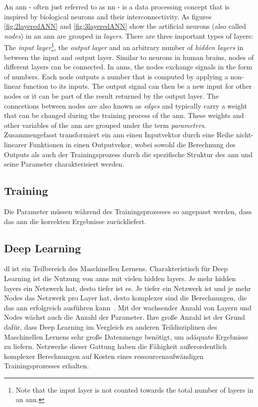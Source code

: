 \documentclass[
			   fontsize=11pt,
               paper=a4,
               bibliography=totoc,
               idxtotoc,
               headsepline,
               footsepline,
               footinclude=false,
               BCOR=12mm,
               DIV=13,
               openany,   %
               ]
               {scrbook}
\begin{document}
An \gls{ann} - often just referred to as \gls{nn} - is a data processing concept that is inspired by biological neurons and their interconnectivity. As figures \ref{fig:2layeredANN} and \ref{fig:3layeredANN} show the artificial neurons (also called \textit{nodes}) in an \gls{ann} are grouped in \textit{layers}. There are three important types of layers: The \textit{input layer}\footnote{Note that the input layer is not counted towards the total number of layers in an \gls{ann}.}, the \textit{output layer} and an arbitrary number of \textit{hidden layers} in between the input and output layer. Similar to neurons in human brains, nodes of different layers can be connected. In \glspl{ann}, the nodes exchange signals in the form of numbers. Each node outputs a number that is computed by applying a non-linear function to its inputs. The output signal can then be a new input for other nodes or it can be part of the result returned by the output layer. The conncetions between nodes are also known as \textit{edges} and typically carry a weight that can be changed during the training process of the \gls{ann}. These weights and other variables of the \gls{ann} are grouped under the term \textit{parameters}. Zusammengefasst transformiert ein \gls{ann} einen Inputvektor durch eine Reihe nicht-linearer Funktionen in einen Outputvekor, wobei sowohl die Berechnung des Outputs als auch der Trainingsprozess durch die spezifische Struktur des \gls{ann} und seine Parameter charakterisiert werden.


\subsection{Training}

Die Parameter müssen während des Trainingsprozesses so angepasst werden, dass das \gls{ann} die korrekten Ergebnisse zurückliefert.

\subsection{Deep Learning}

\Gls{dl} ist ein Teilbereich des Maschinellen Lernens. Charakteristisch für Deep Learning ist die Nutzung von \glspl{ann} mit vielen hidden layers. Je mehr hidden layers ein Netzwerk hat, desto tiefer ist es. Je tiefer ein Netzwerk ist und je mehr Nodes das Netzwerk pro Layer hat, desto komplexer sind die Berechnungen, die das \gls{ann} erfolgreich ausführen kann~\cite{dlBookGoodf}. Mit der wachsender Anzahl von Layern und Nodes wächst auch die Anzahl der Parameter. Ihre große Anzahl ist der Grund dafür, dass Deep Learning im Vergleich zu anderen Teildisziplinen des Maschinellen Lernens sehr große Datenmenge benötigt, um adäquate Ergebnisse zu liefern. Netzwerke dieser Gattung haben die Fähigkeit außerordentlich komplexer Berechnungen auf Kosten eines ressourcenaufwändigen Trainingsprozesses erhalten.
\end{document}
